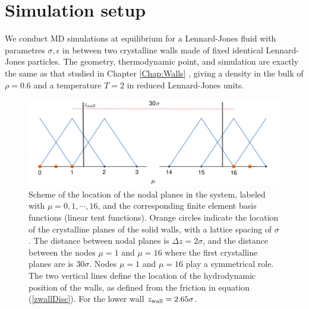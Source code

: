 \documentclass[b5paper,openright,10pt]{book}
\begin{document}
\section{Simulation setup}
\label{Sec:sim}
We conduct  MD simulations  at equilibrium  for a  Lennard-Jones fluid
with  parametres $\sigma,\epsilon$  in between  two crystalline  walls
made  of fixed  identical Lennard-Jones  particles.  The  geometry,
thermodynamic point, and simulation are  exactly the same as that studied in Chapter \ref{Chap:Walls} ,
giving  a  density in  the  bulk  of  $\rho=0.6  $ and  a  temperature
$T=2$ in reduced Lennard-Jones  units.  
\begin{figure}[]
  \centering
  \includegraphics[scale=0.2]{SchemeNodes-4}
  \caption[Scheme of the location of the nodal planes in the system]{Scheme of the location of the nodal planes in the system, labeled
  with $\mu=0,1,\cdots,16$, and the corresponding finite element basis
  functions  (linear  tent  functions).    Orange  circles  indicate  the
  location  of the  crystalline  planes  of the  solid  walls, with  a
  lattice spacing  of $\sigma$. The  distance between nodal  planes is
  $\Delta z = 2\sigma$, and the distance between the nodes $\mu=1$ and
  $\mu=16$  where  the first  crystalline  planes  are is  $30\sigma$.
  Nodes  $\mu=1$  and  $\mu=16$  play a  symmetrical  role.   The  two
  vertical lines define  the location of the  hydrodynamic position of
  the walls, as  defined from the friction  in equation  (\ref{zwallDisc}).
  For the lower wall $z_{\rm wall}=2.65\sigma$. }
\label{Fig.Nodes}
\end{figure}
\end{document}
